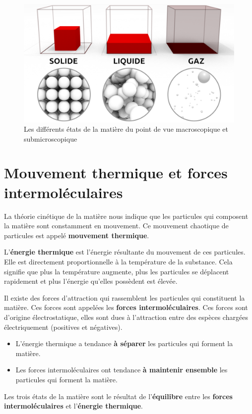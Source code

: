 \documentclass[
  11pt,
  a4paper,
  openany]{book}
\providecommand{\tightlist}{%
  \setlength{\itemsep}{0pt}\setlength{\parskip}{0pt}}
\begin{document}
\begin{figure}

{\centering \includegraphics[width=0.5\linewidth]{images/solide-liquide-gaz} 

}

\caption{Les différents états de la matière du point de vue macroscopique et submicroscopique}\label{fig:solide-liquide-gaz}
\end{figure}

\section{Mouvement thermique et forces intermoléculaires}\label{mouvement-thermique-et-forces-intermoluxe9culaires}

La théorie cinétique de la matière nous indique que les particules qui composent la matière sont constamment en mouvement. Ce mouvement chaotique de particules est appelé \textbf{mouvement thermique}.

L'\textbf{énergie thermique} est l'énergie résultante du mouvement de ces particules. Elle est directement proportionnelle à la température de la substance. Cela signifie que plus la température augmente, plus les particules se déplacent rapidement et plus l'énergie qu'elles possèdent est élevée.

Il existe des forces d'attraction qui rassemblent les particules qui constituent la matière. Ces forces sont appelées les \textbf{forces intermoléculaires}. Ces forces sont d'origine électrostatique, elles sont dues à l'attraction entre des espèces chargées électriquement (positives et négatives).

\begin{itemize}
\tightlist
\item
  L'énergie thermique a tendance \textbf{à séparer} les particules qui forment la matière.
\item
  Les forces intermoléculaires ont tendance \textbf{à maintenir ensemble} les particules qui forment la matière.
\end{itemize}

Les trois états de la matière sont le résultat de l'\textbf{équilibre} entre les \textbf{forces intermoléculaires} et l'\textbf{énergie thermique}.
\end{document}
